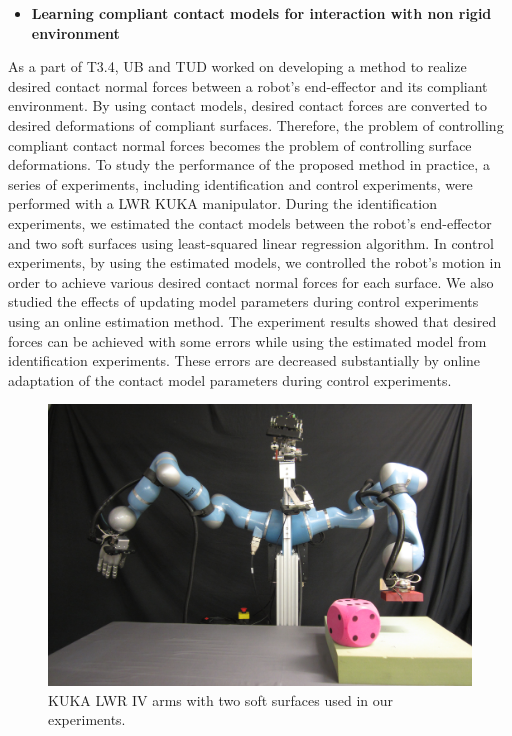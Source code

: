\begin{itemize}
\item \textbf{Learning compliant contact models for interaction with non rigid environment}
\end{itemize}
As a part of T3.4, UB and TUD worked on developing a method to realize desired
contact normal forces between a robot's end-effector and its compliant
environment.  By using contact models, desired contact forces are converted to
desired deformations of compliant surfaces.  Therefore, the problem of
controlling compliant contact normal forces becomes the problem of controlling
surface deformations.  To study the performance of the proposed method in
practice, a series of experiments, including identification and control
experiments, were performed with a LWR KUKA manipulator.  During the
identification experiments, we estimated the contact models between the
robot's end-effector and two soft surfaces using least-squared linear
regression algorithm.  In control experiments, by using the estimated models,
we controlled the robot's motion in order to achieve various desired contact
normal forces for each surface.  We also studied the effects of updating model
parameters during control experiments using an online estimation method.  The
experiment results showed that desired forces can be achieved with some errors
while using the estimated model from identification experiments.  These errors
are decreased substantially by online adaptation of the contact model
parameters during control experiments.
%
\begin{figure}
  \centering
  \includegraphics[scale=0.1]{images/Boris.jpg}
  \caption{KUKA LWR IV arms with two soft surfaces used in our experiments.}
  \label{Boris}
\end{figure}

